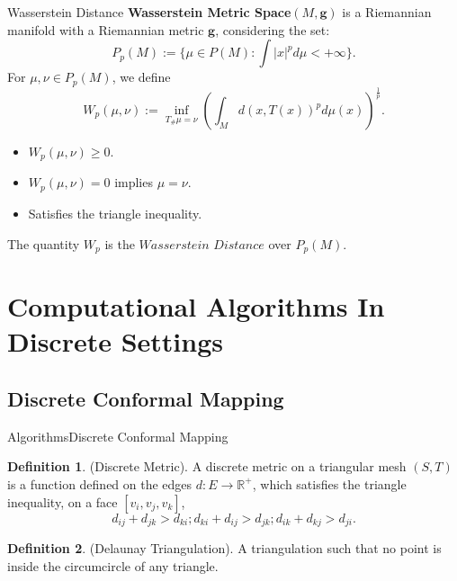 \documentclass{beamer}
\theoremstyle{definition}
\newtheorem{mydef}{Definition}
\begin{document}
\begin{frame}{Wasserstein Distance}
\textbf{Wasserstein Metric Space}$(M, \mathbf{g})$ is a Riemannian manifold with a Riemannian metric $\mathbf{g}$, considering the set: $$P_p(M):=\{\mu\in P(M): \int|x|^pd\mu<+\infty\}.$$
For $\mu,\nu\in P_p(M)$, we define $$W_p(\mu,\nu):=\inf_{T_\#\mu=\nu}(\int_Md(x,T(x))^pd\mu(x))^{\frac{1}{p}}.$$
\begin{itemize}
\item $W_p(\mu,\nu)\geq 0$.
\item $W_p(\mu,\nu)=0$ implies $\mu = \nu$.
\item Satisfies the triangle inequality.
\end{itemize}
The quantity $W_p$ is the $Wasserstein$ $Distance$ over $P_p(M)$.
\end{frame}


\section{Computational Algorithms In Discrete Settings}

\subsection{Discrete Conformal Mapping}
\begin{frame}{Algorithms}{Discrete Conformal Mapping}
\begin{mydef}
(Discrete Metric). A discrete metric on a triangular mesh $(S,T)$ is a function defined on the edges $d:E\rightarrow \mathbb{R}^+$, which satisfies the triangle inequality, on a face $[v_i,v_j,v_k]$, $$d_{ij}+d_{jk}>d_{ki};d_{ki}+d_{ij}>d_{jk};d_{ik}+d_{kj}>d_{ji}.$$
\end{mydef}
\begin{mydef}
(Delaunay Triangulation). A triangulation such that no point is inside the circumcircle of any triangle.
\end{mydef}
\end{frame}
\end{document}

